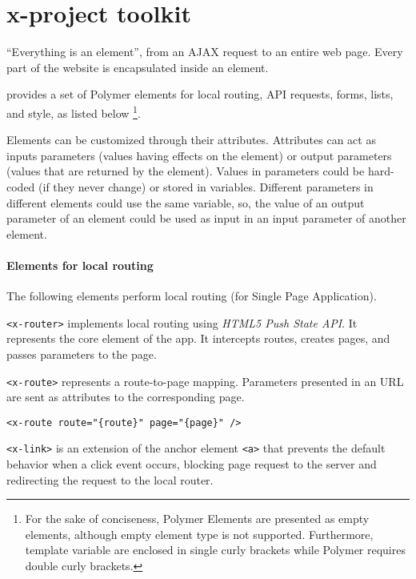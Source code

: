 \section{x-project toolkit}\label{sec:toolkit}

``Everything is an element'', from an AJAX request to an entire web page. Every part of the website is encapsulated inside an element. 

 provides a set of Polymer elements for local routing, API requests, forms, lists, and style, as listed below \footnote{\scriptsize For the sake of conciseness, Polymer Elements are presented as empty elements, although empty element type is not supported. Furthermore, template variable are enclosed in single curly brackets while Polymer requires double curly brackets.}. 

Elements can be customized through their attributes. Attributes can act as inputs parameters (values having effects on the element) or output parameters (values that are returned by the element).
Values in parameters could be hard-coded (if they never change) or stored in variables.
Different parameters in different elements could use the same variable, so, the value of an output parameter of an element could be used as input in an input parameter of another element.

\paragraph{Elements for local routing}

The following elements perform local routing (for Single Page Application).

\vspace{0.2cm}

\texttt{<x-router>} implements local routing using \emph{HTML5 Push State API}. It represents the core element of the app. It intercepts routes, creates pages, and passes parameters to the page.

\vspace{0.2cm}

\texttt{<x-route>} represents a route-to-page mapping. 
Parameters presented in an URL are sent as attributes to the corresponding page.

\begin{lstlisting}[language=HTML5]
<x-route route="{route}" page="{page}" />
\end{lstlisting}

\texttt{<x-link>} is an extension of the anchor element \texttt{<a>} that prevents the default behavior when a click event occurs, blocking page request to the server and redirecting the request to the local router. 

